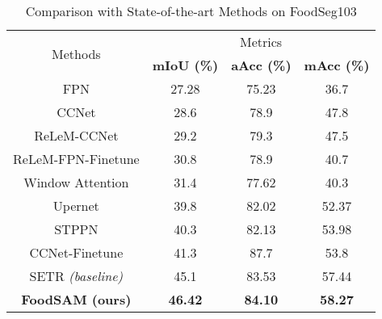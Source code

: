 \documentclass[lettersize,journal]{IEEEtran}
\begin{document}
\begin{table}[]
\centering
\caption{Comparison with State-of-the-art Methods on FoodSeg103}
\begin{tabular}{c|ccc}
\hline
\multicolumn{1}{c}{\multirow{2}{*}{Methods}} & \multicolumn{3}{c}{Metrics}                   \\ \cline{2-4} 
\multicolumn{1}{c}{}                         & \textbf{mIoU (\%)} & \textbf{aAcc (\%)} & \textbf{mAcc (\%)} \\ \hline
FPN \cite{kirillov2019panoptic}              & 27.28         & 75.23         & 36.7          \\
CCNet \cite{huang2019ccnet}                   & 28.6          & 78.9          & 47.8          \\
ReLeM-CCNet \cite{wu2021large}                & 29.2          & 79.3          & 47.5          \\
ReLeM-FPN-Finetune \cite{wu2021large}                          & 30.8          & 78.9          & 40.7          \\
Window Attention \cite{dong2021windows}       & 31.4          & 77.62         & 40.3          \\
Upernet \cite{xiao2018unified}                & 39.8          & 82.02         & 52.37 \\
STPPN \cite{wang2022swin}                     & 40.3          & 82.13         & 53.98         \\
CCNet-Finetune                                & 41.3          & 87.7          & 53.8          \\
\hline
SETR \cite{zheng2021rethinking} \emph{(baseline)}   & 45.1          & 83.53         & 57.44         \\
\textbf{FoodSAM (ours)}                        & \textbf{46.42}            & \textbf{84.10}            & \textbf{58.27}             \\ \hline
\end{tabular}
\captionsetup{justification=centering}
\label{tab: foodseg103 sota}
\end{table} 
\end{document}
